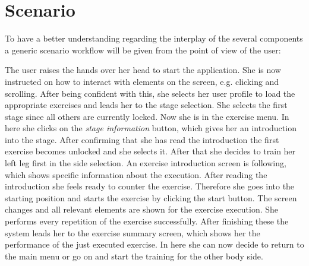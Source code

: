 \section{Scenario}\label{4_7_requirements_scenario}
To have a better understanding regarding the interplay of the several components a generic scenario workflow will be given from the point of view of the user:

The user raises the hands over her head to start the application. She is now instructed on how to interact with elements on  the screen, e.g. clicking and scrolling. After being confident with this, she selects her user profile to load the appropriate exercises and leads her to the stage selection. She selects the first stage since all others are currently locked. Now she is in the exercise menu. In here she clicks on the \textit{stage information} button, which gives her an introduction into the stage. After confirming that she has read the introduction the first exercise becomes unlocked and she selects it. After that she decides to train her left leg first in the side selection. An exercise introduction screen is following, which shows specific information about the execution. After reading the introduction she feels ready to counter the exercise. Therefore she goes into the starting position and starts the exercise by clicking the start button. The screen changes and all relevant elements are shown for the exercise execution. She performs every repetition of the exercise successfully. After finishing these the system leads her to the exercise summary screen, which shows her the performance of the just executed exercise. In here she can now decide to return to the main menu or go on and start the training for the other body side.

